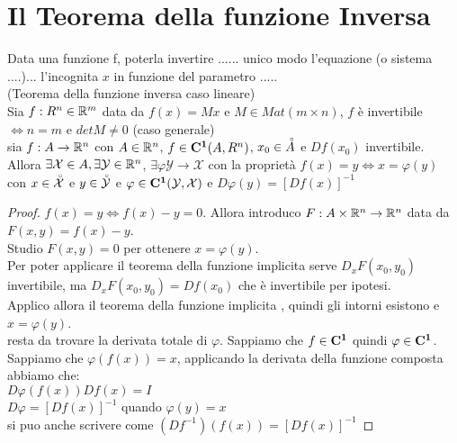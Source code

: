\section{Il Teorema della funzione Inversa}
Data una funzione f, poterla invertire  ...... unico modo l'equazione (o sistema ....)... l'incognita $x$ in funzione del parametro .....\\
\proposition(Teorema della funzione inversa caso lineare)\\
Sia $f:R^n\in \mathbb{R}^m$ data da $f(x)=Mx$ e $M\in Mat(m\times n)$, $f$ è invertibile $\Leftrightarrow n=m$ e $detM\ne 0$
\proposition(caso generale)\\
sia $f:A\rightarrow \mathbb{R}^n$ con $A\in \mathbb{R}^n$, $f\in \mathbf{C^{1}}(A,R^n)$, $x_0\in \accentset{\circ}{A}$ e $Df(x_0)$ invertibile.\\
Allora $\exists\mathcal{X}\in A,\exists\mathcal{Y}\in \mathbb{R}^n$, $\exists\varphi\mathcal{Y}\rightarrow\mathcal{X}$ con la proprietà $f(x)=y\Leftrightarrow x=\varphi(y)$ con $x\in\accentset{\circ}{\mathcal{X}}$ e $y\in\accentset{\circ}{\mathcal{Y}}$ e $\varphi\in \mathbf{C^{1}}(\mathcal{Y},\mathcal{X})$ e $D\varphi(y)=[Df(x)]^{-1}$\\
\begin{proof}
	$f(x)=y\Leftrightarrow f(x)-y=0$. Allora introduco $F:A\times \mathbb{R}^n\rightarrow \mathbb{R}^n$ data da $F(x,y)=f(x)-y$.\\
	Studio $F(x,y)=0$ per ottenere $x=\varphi(y)$.\\
	Per poter applicare il teorema della funzione implicita serve $D_xF(x_0,y_0)$ invertibile, ma $D_xF(x_0,y_0)=Df(x_0)$ che è invertibile per ipotesi.\\
	Applico allora il teorema della funzione implicita , quindi gli intorni esistono e $x=\varphi(y)$.\\
	resta da trovare la derivata totale di $\varphi$. Sappiamo che $f\in \mathbf{C^{1}}$ quindi $\varphi \in \mathbf{C^{1}}$.\\
	Sappiamo che $\varphi(f(x))=x$, applicando la derivata della funzione composta abbiamo che:\\
	$D\varphi(f(x))Df(x)=I$\\
	$D\varphi=[Df(x)]^{-1}$ quando $\varphi(y)=x$\\
	si puo anche scrivere come $(Df^{-1})(f(x))=[Df(x)]^{-1}$
\end{proof}
